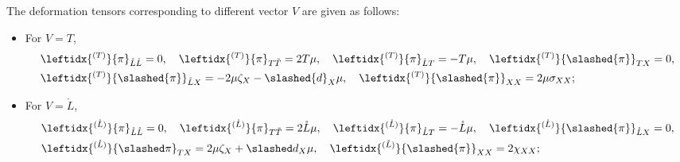 \documentclass[11pt,twoside]{article}
\begin{document}
\begin{lemma}The deformation tensors corresponding to different vector $V$ are given as follows:
\begin{itemize}\label{lem3.4}
\item For $V = T$,
\begin{equation}\label{Lpi}
\begin{split}
&\leftidx{^{(T)}}{\pi}_{\mathring{L}\mathring{L}} = 0,
\quad \leftidx{^{(T)}}{\pi}_{T\tilde{T}} = 2T\mu,
\quad \leftidx{^{(T)}}{\pi}_{\mathring{L}T} = -T\mu,
\quad \leftidx{^{(T)}}{\slashed{\pi}}_{TX} = 0, \\
&\leftidx{^{(T)}}{\slashed{\pi}}_{\mathring{L}X} = -2\mu\zeta_X - \slashed{d}_X\mu,
\quad \leftidx{^{(T)}}{\slashed{\pi}}_{XX} = 2\mu\sigma_{XX};
\end{split}
\end{equation}

\item For $V = \mathring{L}$,
\begin{equation}\label{uLpi}
\begin{split}
&\leftidx{^{(\mathring{L})}}{\pi}_{\mathring{L}\mathring{L}} = 0,
\quad \leftidx{^{(\mathring{L})}}{\pi}_{T\tilde{T}} = 2\mathring{L}\mu,
\quad \leftidx{^{(\mathring{L})}}{\pi}_{\mathring{L}T} = -\mathring{L}\mu,
\quad \leftidx{^{(\mathring{L})}}{\slashed{\pi}}_{\mathring{L}X} = 0, \\
&\leftidx{^{(\mathring L)}}{\slashed\pi}_{TX}=2\mu\zeta_X+\slashed d_X\mu,
\quad \leftidx{^{(\mathring{L})}}{\slashed{\pi}}_{XX} = 2\chi_{XX};
\end{split}
\end{equation}


\end{itemize}
\end{lemma}
\end{document}
